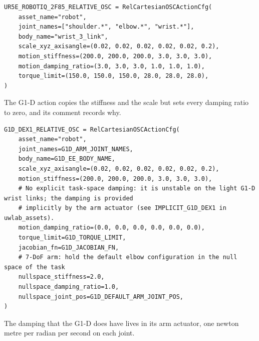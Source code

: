 \begin{snippetbox}[10]
\begin{lstlisting}[firstnumber=15]
UR5E_ROBOTIQ_2F85_RELATIVE_OSC = RelCartesianOSCActionCfg(
    asset_name="robot",
    joint_names=["shoulder.*", "elbow.*", "wrist.*"],
    body_name="wrist_3_link",
    scale_xyz_axisangle=(0.02, 0.02, 0.02, 0.02, 0.02, 0.2),
    motion_stiffness=(200.0, 200.0, 200.0, 3.0, 3.0, 3.0),
    motion_damping_ratio=(3.0, 3.0, 3.0, 1.0, 1.0, 1.0),
    torque_limit=(150.0, 150.0, 150.0, 28.0, 28.0, 28.0),
)
\end{lstlisting}
\end{snippetbox}

The G1-D action copies the stiffness and the scale but sets every damping ratio to zero, and its comment records why.

\begin{snippetbox}[10]
\begin{lstlisting}[firstnumber=27]
G1D_DEX1_RELATIVE_OSC = RelCartesianOSCActionCfg(
    asset_name="robot",
    joint_names=G1D_ARM_JOINT_NAMES,
    body_name=G1D_EE_BODY_NAME,
    scale_xyz_axisangle=(0.02, 0.02, 0.02, 0.02, 0.02, 0.2),
    motion_stiffness=(200.0, 200.0, 200.0, 3.0, 3.0, 3.0),
    # No explicit task-space damping: it is unstable on the light G1-D wrist links; the damping is provided
    # implicitly by the arm actuator (see IMPLICIT_G1D_DEX1 in uwlab_assets).
    motion_damping_ratio=(0.0, 0.0, 0.0, 0.0, 0.0, 0.0),
    torque_limit=G1D_TORQUE_LIMIT,
    jacobian_fn=G1D_JACOBIAN_FN,
    # 7-DoF arm: hold the default elbow configuration in the null space of the task
    nullspace_stiffness=2.0,
    nullspace_damping_ratio=1.0,
    nullspace_joint_pos=G1D_DEFAULT_ARM_JOINT_POS,
)
\end{lstlisting}
\end{snippetbox}

The damping that the G1-D does have lives in its arm actuator, one newton metre per radian per second on each joint.

